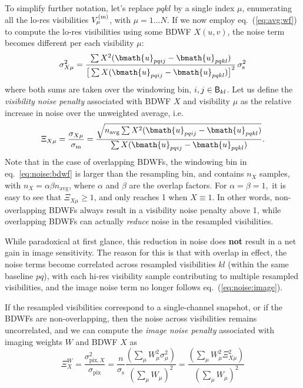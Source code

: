 \documentclass[useAMS,usenatbib]{mn2e}
\begin{document}
To simplify further notation, let's replace $pqkl$ by a single index $\mu$, enumerating all the lo-res visibilities $V^\mathrm{(m)}_\mu$, with 
$\mu=1\dots N$. If we now employ eq.~(\ref{eq:avg:wf}) to compute the lo-res visibilities using some BDWF $X(u,v)$, the noise 
term becomes different per each visibility $\mu$:
\begin{equation}
\label{eq:noise:bdwf}
\sigma_{X\mu}^2 = \frac{\sum X^2(\bmath{u}_{pqij}-\bmath{u}_{pqkl})}
{\big [ \sum X(\bmath{u}_{pqij}-\bmath{u}_{pqkl}) \big ]^2 } \, \sigma_\mathrm{s}^2
\end{equation}
where both sums are taken over the windowing bin, ${i,j}\in \mathsf{B}_{kl}$. Let us define 
the \emph{visibility noise penalty} associated with BDWF $X$ 
and visibility $\mu$ as the relative increase in noise over the unweighted average, i.e.
\begin{equation}
\Xi_{X\mu} = \frac{\sigma_{X\mu}}{\sigma_\mathrm{m}} = 
\frac{ \sqrt{ n_\mathrm{avg} \sum X^2(\bmath{u}_{pqij}-\bmath{u}_{pqkl}) }}
{\sum X(\bmath{u}_{pqij}-\bmath{u}_{pqkl}) }. 
\end{equation}
Note that in the case of overlapping BDWFs, the windowing bin in eq.~\ref{eq:noise:bdwf} is larger than the 
resampling bin, and contains $n_X$ samples, with $n_X=\alpha\beta n_\mathrm{avg}$, where $\alpha$ and $\beta$ are the 
overlap factors. For $\alpha=\beta=1,$ it is easy to see that $\Xi_{X\mu}\geq1$, and only reaches 1 when $X\equiv1$. 
In other words, non-overlapping BDWFs always result in a visibility noise penalty above 1, while overlapping BDWFs 
can actually \emph{reduce} noise in the resampled visibilities. 

While paradoxical at first glance, this reduction in noise does {\bf not} result in a net gain in image 
sensitivity. The reason for this is that with overlap in effect, the noise terms become correlated across 
resampled visibilities $kl$ (within the same baseline $pq$), with each hi-res visibility sample contributing to 
multiple resampled visibilities, and the image noise term no longer follows eq.~(\ref{eq:noise:image}).

If the resampled visibilities correspond to a single-channel snapshot, or if the BDWFs are non-overlapping,
then the noise across visibilities remains uncorrelated, and we can compute the \emph{image noise penalty} 
associated with imaging weights $W$ and BDWF $X$ as
\begin{equation}
\Xi^W_X = 
\frac{\sigma_{\mathrm{pix},X}^2}{\sigma_{\mathrm{pix}}} = \frac{n}{\sigma_\mathrm{s}}
\frac{ (\sum_{\mu} W_{\mu}^2 \sigma_\mu^2) }{  (\sum_{\mu} W_{\mu})^2 } =
\frac{ (\sum_{\mu} W_{\mu}^2 \Xi_{X\mu}^2) }{ (\sum_{\mu} W_{\mu})^2 } 
\end{equation}
\end{document}
